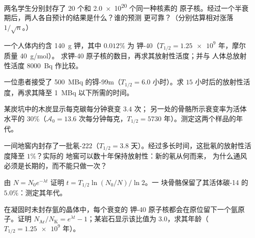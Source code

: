 \begin{exercise}[$\star\star$]\label{exo:g12:radioactive-decay:7}
两名学生分别封存了 $20$ 个和 \num{2.0e20} 个同一种核素的
原子核。经过一个半衰期后，两人各自预计的结果是什么？谁的预测
更可靠？（分别估算相对涨落 $1/\sqrt n$。）
\end{exercise}

\begin{exercise}[$\star\star$]\label{exo:g12:radioactive-decay:8}
一个人体内约含 \qty{140}{g} 钾，其中 $0.012\%$ 为
钾-40（$T_{1/2} = \num{1.25e9}$ 年，摩尔质量 \qty{40}{g/mol}）。
求钾-40 原子核的数目，再求其放射性活度；并与
人体总放射性活度 \qty{8000}{Bq} 作比较。
\end{exercise}

\begin{exercise}[$\star\star$]\label{exo:g12:radioactive-decay:9}
一位患者接受了 \qty{500}{MBq} 的锝-99m（$T_{1/2} = 6.0$
小时）。求 $15$ 小时后的放射性活度，再求其降至
\qty{1}{MBq} 以下所需的时间。
\end{exercise}

\begin{exercise}[$\star\star$]\label{exo:g12:radioactive-decay:10}
某炭坑中的木炭显示每克碳每分钟衰变 $3.4$ 次；
另一处的骨骼所示衰变率为活体水平的 $30\%$（$\mathcal A_0 = 13.6$
次每分钟每克，$T_{1/2} = \num{5730}$ 年）。测定这两个样品的年代。
\end{exercise}

\begin{exercise}[$\star\star$]\label{exo:g12:radioactive-decay:11}
一间地窖内封存了一批氡-222（$T_{1/2} = 3.8$
天）。经过多长时间，这批氡的放射性活度降至 $1\%$？实际的
地窖可以数十年保持放射性：新的氡从何而来，
为什么通风必须是长期的，而不能只做一次？
\end{exercise}

\begin{exercise}[$\star\star\star$]\label{exo:g12:radioactive-decay:12}
由 $N = N_0 e^{-\lambda t}$ 证明 $t = T_{1/2}\ln(N_0/N)/\ln 2$。一
块骨骼保留了其活体碳-14 的 $5.0\%$：测定其年代。
\end{exercise}

\begin{exercise}[$\star\star\star$]\label{exo:g12:radioactive-decay:13}
在凝固时未封存氩的晶体中，每个衰变的
钾-40 原子核都会在原位留下一个氩原子。证明
$N_{\mathrm{Ar}}/N_{\mathrm K} = e^{\lambda t} - 1$；某岩石显示该比值为
$3.0$，求其年龄（$T_{1/2} = \num{1.25e9}$ 年）。
\end{exercise}

